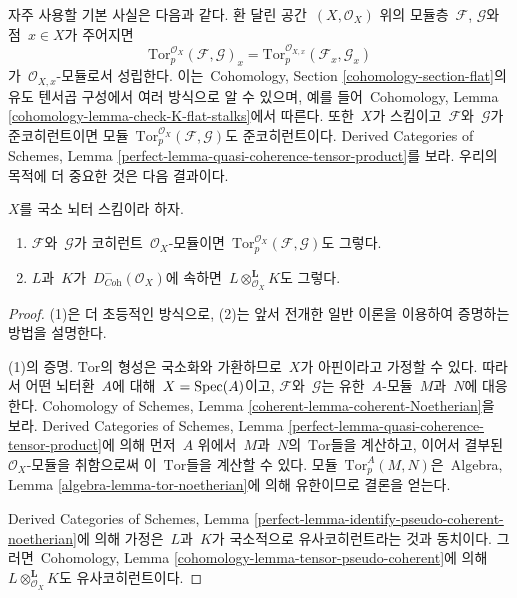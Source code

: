 \noindent
자주 사용할 기본 사실은 다음과 같다. 환 달린 공간\ 
$(X, \mathcal{O}_X)$ 위의 모듈층\  $\mathcal{F}$, $\mathcal{G}$와
점\  $x \in X$가 주어지면
$$
\text{Tor}_p^{\mathcal{O}_X}(\mathcal{F}, \mathcal{G})_x =
\text{Tor}_p^{\mathcal{O}_{X, x}}(\mathcal{F}_x, \mathcal{G}_x)
$$
가\  $\mathcal{O}_{X, x}$-모듈로서 성립한다.
이는\  Cohomology, Section \ref{cohomology-section-flat}의 유도 텐서곱
구성에서 여러 방식으로 알 수 있으며, 예를 들어\  Cohomology, Lemma
\ref{cohomology-lemma-check-K-flat-stalks}에서 따른다.
또한\  $X$가 스킴이고\  $\mathcal{F}$와\  $\mathcal{G}$가 준코히런트이면
모듈\ 
$\text{Tor}_p^{\mathcal{O}_X}(\mathcal{F}, \mathcal{G})$도
준코히런트이다. Derived Categories of Schemes, Lemma
\ref{perfect-lemma-quasi-coherence-tensor-product}를 보라.
우리의 목적에 더 중요한 것은 다음 결과이다.

\begin{lemma}
\label{lemma-tensor-coherent}
$X$를 국소 뇌터 스킴이라 하자.
\begin{enumerate}
\item $\mathcal{F}$와\  $\mathcal{G}$가 코히런트\  $\mathcal{O}_X$-모듈이면\ 
$\text{Tor}_p^{\mathcal{O}_X}(\mathcal{F}, \mathcal{G})$도 그렇다.
\item $L$과\  $K$가\  $D^-_{\textit{Coh}}(\mathcal{O}_X)$에 속하면\ 
$L \otimes_{\mathcal{O}_X}^\mathbf{L} K$도 그렇다.
\end{enumerate}
\end{lemma}

\begin{proof}
(1)은 더 초등적인 방식으로, (2)는 앞서 전개한 일반 이론을 이용하여
증명하는 방법을 설명한다.

\medskip\noindent
(1)의 증명. $\text{Tor}$의 형성은 국소화와 가환하므로\ 
$X$가 아핀이라고 가정할 수 있다. 따라서 어떤 뇌터환\  $A$에 대해\ 
$X = \mathop{\mathrm{Spec}}(A)$이고, $\mathcal{F}$와\  $\mathcal{G}$는 유한\  $A$-모듈\ 
$M$과\  $N$에 대응한다. Cohomology of Schemes, Lemma
\ref{coherent-lemma-coherent-Noetherian}을 보라.
Derived Categories of Schemes, Lemma
\ref{perfect-lemma-quasi-coherence-tensor-product}에 의해 먼저\ 
$A$ 위에서\  $M$과\  $N$의\  $\text{Tor}$들을 계산하고, 이어서 결부된\ 
$\mathcal{O}_X$-모듈을 취함으로써 이\  $\text{Tor}$들을 계산할 수 있다.
모듈\  $\text{Tor}_p^A(M, N)$은\  Algebra, Lemma
\ref{algebra-lemma-tor-noetherian}에 의해 유한이므로 결론을 얻는다.

\medskip\noindent
Derived Categories of Schemes, Lemma
\ref{perfect-lemma-identify-pseudo-coherent-noetherian}에 의해 가정은\ 
$L$과\  $K$가 국소적으로 유사코히런트라는 것과 동치이다. 그러면\ 
Cohomology, Lemma \ref{cohomology-lemma-tensor-pseudo-coherent}에 의해\ 
$L \otimes_{\mathcal{O}_X}^\mathbf{L} K$도 유사코히런트이다.
\end{proof}

